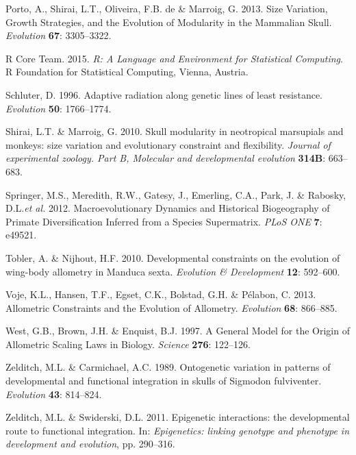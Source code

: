 \documentclass[12pt,]{article}
\begin{document}
Porto, A., Shirai, L.T., Oliveira, F.B. de \& Marroig, G. 2013. Size
Variation, Growth Strategies, and the Evolution of Modularity in the
Mammalian Skull. \emph{Evolution} \textbf{67}: 3305--3322.

R Core Team. 2015. \emph{R: A Language and Environment for Statistical
Computing}. R Foundation for Statistical Computing, Vienna, Austria.

Schluter, D. 1996. Adaptive radiation along genetic lines of least
resistance. \emph{Evolution} \textbf{50}: 1766--1774.

Shirai, L.T. \& Marroig, G. 2010. Skull modularity in neotropical
marsupials and monkeys: size variation and evolutionary constraint and
flexibility. \emph{Journal of experimental zoology. Part B, Molecular
and developmental evolution} \textbf{314B}: 663--683.

Springer, M.S., Meredith, R.W., Gatesy, J., Emerling, C.A., Park, J. \&
Rabosky, D.L.\emph{et al.} 2012. Macroevolutionary Dynamics and
Historical Biogeography of Primate Diversification Inferred from a
Species Supermatrix. \emph{PLoS ONE} \textbf{7}: e49521.

Tobler, A. \& Nijhout, H.F. 2010. Developmental constraints on the
evolution of wing-body allometry in Manduca sexta. \emph{Evolution \&
Development} \textbf{12}: 592--600.

Voje, K.L., Hansen, T.F., Egset, C.K., Bolstad, G.H. \& Pélabon, C.
2013. Allometric Constraints and the Evolution of Allometry.
\emph{Evolution} \textbf{68}: 866--885.

West, G.B., Brown, J.H. \& Enquist, B.J. 1997. A General Model for the
Origin of Allometric Scaling Laws in Biology. \emph{Science}
\textbf{276}: 122--126.

Zelditch, M.L. \& Carmichael, A.C. 1989. Ontogenetic variation in
patterns of developmental and functional integration in skulls of
Sigmodon fulviventer. \emph{Evolution} \textbf{43}: 814--824.

Zelditch, M.L. \& Swiderski, D.L. 2011. Epigenetic interactions: the
developmental route to functional integration. In: \emph{Epigenetics:
linking genotype and phenotype in development and evolution}, pp.
290--316.
\end{document}

